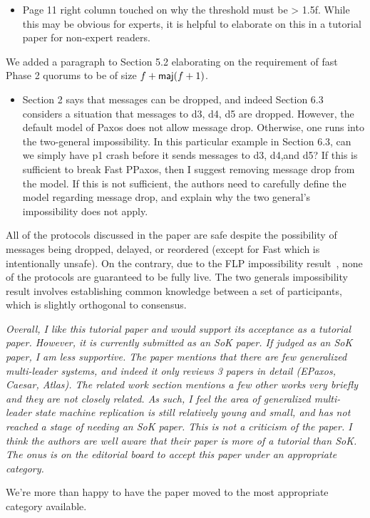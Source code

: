 \documentclass[letterpaper,twocolumn,10pt]{article}
\newenvironment{reviewerquote}
{\list{}{\leftmargin=\parindent\rightmargin=0in}\item[] \itshape \color{ReviewerDarkGray}}%
{\endlist}
\begin{document}
\begin{reviewerquote}
  \begin{itemize}
    \item
      Page 11 right column touched on why the threshold must be > 1.5f. While
      this may be obvious for experts, it is helpful to elaborate on this in a
      tutorial paper for non-expert readers.
  \end{itemize}
\end{reviewerquote}

We added a paragraph to Section 5.2 elaborating on the requirement of fast
Phase 2 quorums to be of size $f + \textsf{maj}(f+1)$.

\begin{reviewerquote}
  \begin{itemize}
    \item
      Section 2 says that messages can be dropped, and indeed Section 6.3
      considers a situation that messages to d3, d4, d5 are dropped. However,
      the default model of Paxos does not allow message drop. Otherwise, one
      runs into the two-general impossibility. In this particular example in
      Section 6.3, can we simply have p1 crash before it sends messages to d3,
      d4,and d5? If this is sufficient to break Fast PPaxos, then I suggest
      removing message drop from the model. If this is not sufficient, the
      authors need to carefully define the model regarding message drop, and
      explain why the two general's impossibility does not apply.
  \end{itemize}
\end{reviewerquote}

All of the protocols discussed in the paper are safe despite the possibility of
messages being dropped, delayed, or reordered (except for Fast \BPaxos{} which
is intentionally unsafe). On the contrary, due to the FLP impossibility
result~\cite{fischer1982impossibility}, none of the protocols are guaranteed to
be fully live. The two generals impossibility result involves establishing
common knowledge between a set of participants, which is slightly orthogonal to
consensus.

\begin{reviewerquote}
  Overall, I like this tutorial paper and would support its acceptance as a
  tutorial paper. However, it is currently submitted as an SoK paper. If judged
  as an SoK paper, I am less supportive. The paper mentions that there are few
  generalized multi-leader systems, and indeed it only reviews 3 papers in
  detail (EPaxos, Caesar, Atlas). The related work section mentions a few other
  works very briefly and they are not closely related. As such, I feel the area
  of generalized multi-leader state machine replication is still relatively
  young and small, and has not reached a stage of needing an SoK paper. This is
  not a criticism of the paper. I think the authors are well aware that their
  paper is more of a tutorial than SoK. The onus is on the editorial board to
  accept this paper under an appropriate category.
\end{reviewerquote}

We're more than happy to have the paper moved to the most appropriate category
available.




\end{document}
